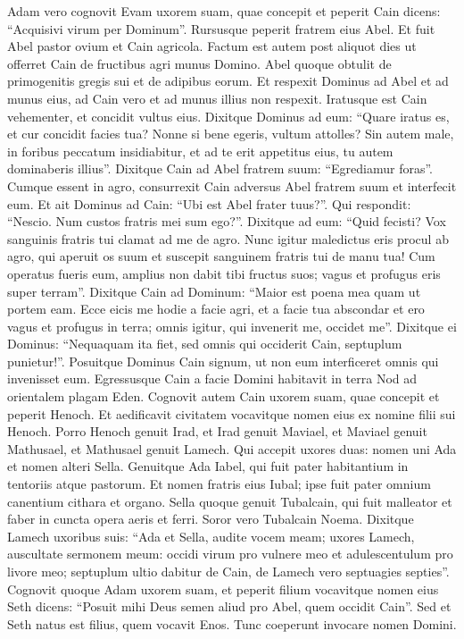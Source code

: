 \begin{biblechapter}
\begin{biblechapter}
\begin{biblechapter}
\begin{biblechapter}
\verse Adam vero cognovit Evam uxorem suam, quae concepit et peperit Cain dicens: “Acquisivi virum per Dominum”. 
\verse Rursusque peperit fratrem eius Abel. Et fuit Abel pastor ovium et Cain agricola. 
\verse Factum est autem post aliquot dies ut offerret Cain de fructibus agri munus Domino. 
\verse Abel quoque obtulit de primogenitis gregis sui et de adipibus eorum. Et respexit Dominus ad Abel et ad munus eius, 
\verse ad Cain vero et ad munus illius non respexit. Iratusque est Cain vehementer, et concidit vultus eius. 
\verse Dixitque Dominus ad eum: “Quare iratus es, et cur concidit facies tua? 
\verse Nonne si bene egeris, vultum attolles? Sin autem male, in foribus peccatum insidiabitur, et ad te erit appetitus eius, tu autem dominaberis illius”. 
\verse Dixitque Cain ad Abel fratrem suum: “Egrediamur foras”. Cumque essent in agro, consurrexit Cain adversus Abel fratrem suum et interfecit eum. 
\verse Et ait Dominus ad Cain: “Ubi est Abel frater tuus?”. Qui respondit: “Nescio. Num custos fratris mei sum ego?”. 
\verse Dixitque ad eum: “Quid fecisti? Vox sanguinis fratris tui clamat ad me de agro. 
\verse Nunc igitur maledictus eris procul ab agro, qui aperuit os suum et suscepit sanguinem fratris tui de manu tua! 
\verse Cum operatus fueris eum, amplius non dabit tibi fructus suos; vagus et profugus eris super terram”. 
\verse Dixitque Cain ad Dominum: “Maior est poena mea quam ut portem eam. 
\verse Ecce eicis me hodie a facie agri, et a facie tua abscondar et ero vagus et profugus in terra; omnis igitur, qui invenerit me, occidet me”. 
\verse Dixitque ei Dominus: “Nequaquam ita fiet, sed omnis qui occiderit Cain, septuplum punietur!”. Posuitque Dominus Cain signum, ut non eum interficeret omnis qui invenisset eum.
 \verse Egressusque Cain a facie Domini habitavit in terra Nod ad orientalem plagam Eden.
 \verse Cognovit autem Cain uxorem suam, quae concepit et peperit Henoch. Et aedificavit civitatem vocavitque nomen eius ex nomine filii sui Henoch. 
\verse Porro Henoch genuit Irad, et Irad genuit Maviael, et Maviael genuit Mathusael, et Mathusael genuit Lamech. 
\verse Qui accepit uxores duas: nomen uni Ada et nomen alteri Sella. 
\verse Genuitque Ada Iabel, qui fuit pater habitantium in tentoriis atque pastorum. 
\verse Et nomen fratris eius Iubal; ipse fuit pater omnium canentium cithara et organo. 
\verse Sella quoque genuit Tubalcain, qui fuit malleator et faber in cuncta opera aeris et ferri. Soror vero Tubalcain Noema. 
\verse Dixitque Lamech uxoribus suis:
 “Ada et Sella, audite vocem meam; uxores Lamech, auscultate sermonem meum:
 occidi virum pro vulnere meo
 et adulescentulum pro livore meo; 
\verse septuplum ultio dabitur de Cain, de Lamech vero septuagies septies”.
 \verse Cognovit quoque Adam uxorem suam, et peperit filium vocavitque nomen eius Seth dicens: “Posuit mihi Deus semen aliud pro Abel, quem occidit Cain”. 
\verse Sed et Seth natus est filius, quem vocavit Enos. Tunc coeperunt invocare nomen Domini.
 

\end{biblechapter}
\end{biblechapter}
\end{biblechapter}
\end{biblechapter}
